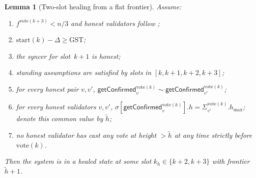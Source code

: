 \documentclass{article}
\newcommand{\hmax}{\ensuremath{h_{\max}}\xspace}
\newcommand{\start}{\ensuremath{\mathrm{start}}}
\newcommand{\vote}{\ensuremath{\mathrm{vote}}}
\newcommand{\GST}{\ensuremath{\mathrm{GST}}\xspace}
\newcommand{\comm}[1]{\ensuremath{\widetilde{#1}}}
\newcommand{\getConfirmed}{\textsf{getConfirmed}\xspace}
\theoremstyle{plain}
\newtheorem{lemma}{Lemma}
\theoremstyle{definition}
\theoremstyle{remark}
\begin{document}
\begin{lemma}[Two-slot healing from a flat frontier]\label{lem:healing-2slot-flat-frontier}
Assume:
\begin{enumerate}
  \item\label{rev:hfj:f} $f^{\vote(k+3)} < n/3$ and honest validators follow ;
  \item\label{rev:hfj:sync} $\start(k) - \Delta \geq \GST$;
  \item\label{rev:hfj:syncers} the syncer for slot~$k+1$ is honest;
  \item\label{rev:hfj:standing} standing assumptions are satisfied by slots in $[k,k+1,k+2,k+3]$;
  \item\label{rev:hfj:compat} for every honest pair $v, v'$, $\getConfirmed_v^{\vote(k)} \sim \getConfirmed_{v'}^{\vote(k)}$;
  \item\label{rev:hfj:gt-hmax} for every honest validators $v, v'$, $\sigma[\getConfirmed_v^{\vote(k)}].h = \Sigma_{v'}^{\vote(k)}.\hmax$; denote this common value by $\comm{h}$;
  \item\label{rev:hfj:nh} no honest validator has cast any vote at height $> \comm{h}$ at any time strictly before $\vote(k)$.
\end{enumerate}
Then the system is in a healed state at some slot $k_h \in \{k+2, k+3\}$ with frontier $\comm{h}+1$.
\end{lemma}
\end{document}
